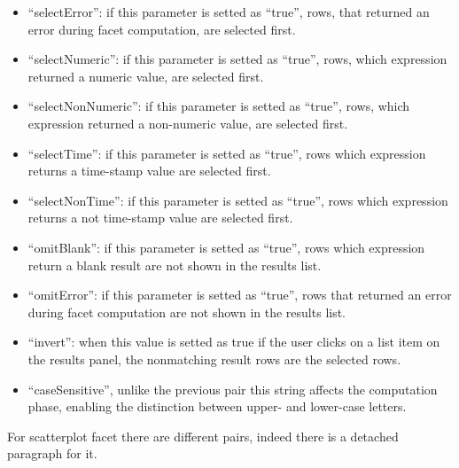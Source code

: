 \begin{itemize}
\begin{itemize}
		\item \textsf{``selectError''}: if this parameter is setted as ``true'', rows, that returned an error during facet computation, are selected first.
    		\item \textsf{``selectNumeric''}: if this parameter is setted as ``true'', rows, which expression returned a numeric value, are selected first.
		\item \textsf{``selectNonNumeric''}: if this parameter is setted as ``true'', rows, which expression returned a non-numeric value, are selected first. 
		\item \textsf{``selectTime''}: if this parameter is setted as ``true'', rows which expression returns a time-stamp value are selected first.
		\item \textsf{``selectNonTime''}: if this parameter is setted as ``true'', rows which expression returns a not time-stamp value are selected first. 
		\item \textsf{``omitBlank''}: if this parameter is setted as ``true'', rows which expression return a blank result are not shown in the results list. 
		\item \textsf{``omitError''}: if this parameter is setted as ``true'', rows that returned an error during facet computation are not shown in the results list. 
		\item \textsf{``invert''}: when this value is setted as true if the user clicks on a list item on the results panel, the nonmatching result rows are the selected rows.
		\item \textsf{``caseSensitive''}, unlike the previous pair this string affects the computation phase, enabling the distinction between upper- and lower-case letters.
	\end{itemize}
\end{itemize}
For scatterplot facet there are different pairs, indeed there is a detached paragraph for it.


